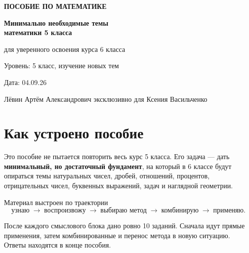\documentclass[12pt,a4paper]{article}
\begin{document}
\begin{titlepage}
\thispagestyle{empty}

\vspace*{24mm}
{\large\bfseries\textcolor{accent}{ПОСОБИЕ ПО МАТЕМАТИКЕ}}\par
\vspace{11mm}
{\Huge\bfseries\textcolor{graphite}{Минимально необходимые темы\\[2mm]математики 5 класса}}\par
\vspace{3mm}
{\LARGE\textcolor{accent}{для уверенного освоения курса 6 класса}}\par
\vspace{12mm}
{\large Уровень: 5 класс, изучение новых тем}\par
\vspace{4mm}
{\large Дата: 04.09.26}\par

\vfill
{\small\textcolor{muted}{Лёвин Артём Александрович эксклюзивно для Ксения Васильченко}}\par
\end{titlepage}

\tableofcontents
\newpage

\section*{Как устроено пособие}

Это пособие не пытается повторить весь курс 5 класса. Его задача --- дать \textbf{минимальный, но достаточный фундамент}, на который в 6 классе будут опираться темы натуральных чисел, дробей, отношений, процентов, отрицательных чисел, буквенных выражений, задач и наглядной геометрии.

Материал выстроен по траектории
\[
\text{узнаю}\;\to\;\text{воспроизвожу}\;\to\;\text{выбираю метод}\;\to\;\text{комбинирую}\;\to\;\text{применяю}.
\]

После каждого смыслового блока дано ровно 10 заданий. Сначала идут прямые применения, затем комбинированные и перенос метода в новую ситуацию. Ответы находятся в конце пособия.
\end{document}

